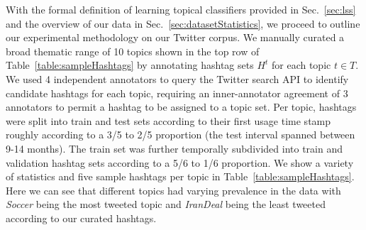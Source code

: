 With the formal definition of learning topical classifiers provided
in Sec.~\ref{sec:lss} and the overview of our data in
Sec.~\ref{sec:datasetStatistics}, we proceed to outline our
experimental methodology on our Twitter corpus.  We manually curated a
broad thematic range of 10 topics shown in the top row of
Table~\ref{table:sampleHashtags}
by annotating hashtag sets $H^t$ for each topic $t \in T$.  We used 4
independent annotators to query the Twitter search API to identify
candidate hashtags for each topic, requiring an inner-annotator
agreement of 3 annotators to permit a hashtag to be assigned to a
topic set.  Per topic, hashtags were split into train and test sets
according to their first usage time stamp roughly according to a 3/5
to 2/5 proportion (the test interval spanned between 9-14 months).  
The train set was further temporally subdivided
into train and validation hashtag sets according to a 5/6 to 1/6
proportion.  We show a variety of statistics and five sample hashtags
per topic in Table~\ref{table:sampleHashtags}.  Here we can see that
different topics had varying prevalence in the data
with \textit{Soccer} being the most tweeted topic
and \textit{IranDeal} being the least tweeted according to our curated
hashtags.

